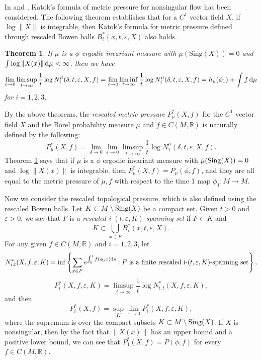 \documentclass[10pt]{article}
\newtheorem{Theorem}{Theorem}[section]
\newtheorem*{Theorem A}{Theorem A}
\newcommand{\Sing}{\text{Sing}}
\newcommand{\dmu}{\,{\rm d}\mu}
\newcommand{\norm}[1]{\|#1\|}
\begin{document}
In \cite{he2004metrical} and \cite{WangChen}, Katok's formula of metric pressure for nonsingular flow has been considered.  The following theorem establishes that for a $C^1$ vector field $X$, if  $\log\|X\|$ is integrable, then Katok's formula for metric pressure defined through rescaled Bowen balls $B_i^*(x, t, \varepsilon, X)$ also holds.

\begin{Theorem}\label{mainthm2}
If \( \mu \) is a $\phi$ ergodic invariant measure with \( \mu(\Sing(X)) = 0 \) and \( \int \log \norm{X(x)} \dmu < \infty \), then we have
\[
\lim_{\varepsilon \to 0} \limsup_{t \to \infty} \frac{1}{t} \log N_i^\mu(\delta, t, \varepsilon, X, f) =\lim_{\varepsilon \to 0} \liminf_{t \to \infty} \frac{1}{t} \log N_i^\mu(\delta, t, \varepsilon, X, f) = h_\mu(\phi_1) + \int f \, {\rm d}\mu
\]
for $i=1,2,3$.
\end{Theorem}

By the above theorems, the {\it rescaled metric pressure } $P_\mu^*(X, f)$ for the $C^1$ vector field $X$ and the Borel probability measure $\mu$ and $f\in C(M, \mathbb{R})$ is naturally defined by the following:
\[P_\mu^*(X, f)=\lim_{\delta\to 0}\lim_{\varepsilon \to 0} \limsup_{t \to \infty} \frac{1}{t} \log N_1^\mu(\delta, t, \varepsilon, X, f).\]
Theorem \ref{mainthm2} says that if $\mu$ is a $\phi$ ergodic invariant measure with $\mu({\rm Sing}(X))=0$ and $\log\|X(x)\|$ is integrable, then $P_\mu^*(X, f)=P_\mu(\phi, f)$, and they are all equal to the metric pressure of $\mu, f$ with respect to the time 1 map $\phi_1: M\to M$.

Now we consider the rescaled topological pressure, which is also defined using the rescaled Bowen balls. Let $K\subset M\setminus {\rm Sing}(X)$ be a compact set. Given $t>0$ and $\varepsilon>0$, we say that $F$ is a {\it rescaled i-$(t, \varepsilon, K)$-spanning set} if $F\subset K$ and
$$K\subset\bigcup_{x\in F}B^*_i(x, t, \varepsilon, X).$$
For any given $f\in C(M, \mathbb{R})$ and $i=1,2,3$, let
\[
N_{i,t}^*(X, f, \varepsilon, K) = \inf\left\{ \sum_{x \in F} e^{\int_0^t f(\phi_s x) {\rm d}s} : F \text{ is a finite rescaled i-} (t,\varepsilon,K)\text{-spanning set} \right\},
\]
\[
{P}_i^*(X, f, \varepsilon,K) = \limsup_{t \to \infty} \frac{1}{t} \log N_{i,t}^*(X, f, \varepsilon,K),
\]
and then
\[
{P}_i^*(X, f) = \sup\limits_{K} \lim_{\varepsilon \to 0} {P}_i^*(X, f, \varepsilon,K),
\]
where the supremum is over the compact subsets \( K \subset M\setminus {\rm Sing}(X) \). If $X$ is nonsingular, then by the fact that $\|X(x)\|$ has an upper bound and a positive lower bound, we can see that $P_1^*(X, f)=P(\phi, f)$ for every $f\in C(M, \mathbb{R})$.
\end{document}
